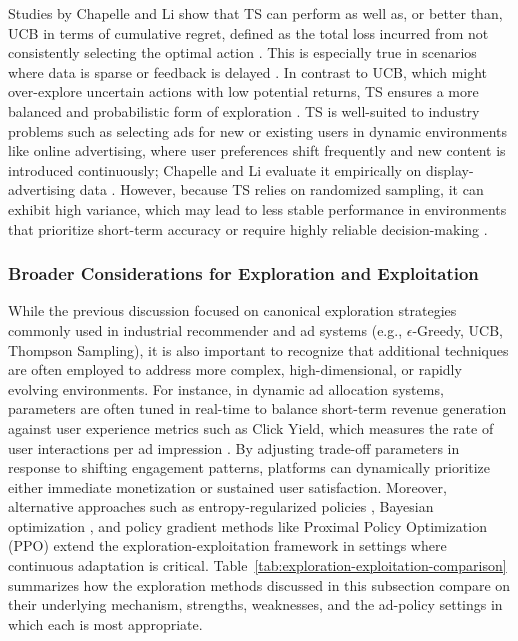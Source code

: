 \documentclass[manuscript,review,screen]{acmart}
\begin{document}
Studies by Chapelle and Li \cite{chapelle2011empirical} show that TS can perform as well as, or better than, UCB in terms of cumulative regret, defined as the total loss incurred from not consistently selecting the optimal action \cite{chapelle2011empirical, russo2018tutorial}. This is especially true in scenarios where data is sparse or feedback is delayed \cite{chapelle2011empirical}. In contrast to UCB, which might over-explore uncertain actions with low potential returns, TS ensures a more balanced and probabilistic form of exploration \cite{russo2018tutorial}. TS is well-suited to industry problems such as selecting ads for new or existing users in dynamic environments like online advertising, where user preferences shift frequently and new content is introduced continuously; Chapelle and Li evaluate it empirically on display-advertising data \cite{chapelle2011empirical}. However, because TS relies on randomized sampling, it can exhibit high variance, which may lead to less stable performance in environments that prioritize short-term accuracy or require highly reliable decision-making \cite{russo2018tutorial}.

\subsubsection{\textbf{Broader Considerations for Exploration and Exploitation}}
While the previous discussion focused on canonical exploration strategies commonly used in industrial recommender and ad systems (e.g., $\epsilon$-Greedy, UCB, Thompson Sampling), it is also important to recognize that additional techniques are often employed to address more complex, high-dimensional, or rapidly evolving environments. For instance, in dynamic ad allocation systems, parameters are often tuned in real-time to balance short-term revenue generation against user experience metrics such as Click Yield, which measures the rate of user interactions per ad impression \cite{zhang2018whole}. By adjusting trade-off parameters in response to shifting engagement patterns, platforms can dynamically prioritize either immediate monetization or sustained user satisfaction. Moreover, alternative approaches such as entropy-regularized policies \cite{mnih2016asynchronous}, Bayesian optimization \cite{shahriari2015taking}, and policy gradient methods like Proximal Policy Optimization (PPO) \cite{schulman2017proximal} extend the exploration-exploitation framework in settings where continuous adaptation is critical. Table~\ref{tab:exploration-exploitation-comparison} summarizes how the exploration methods discussed in this subsection compare on their underlying mechanism, strengths, weaknesses, and the ad-policy settings in which each is most appropriate.
\end{document}
